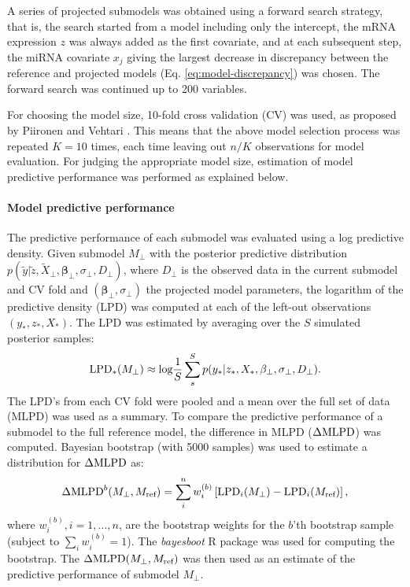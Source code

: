 A series of projected submodels was obtained using a
forward search strategy, that is, the search started from a model including
only the intercept, the mRNA expression $z$ was always added as the first
covariate, and at each subsequent step, the miRNA covariate $x_j$ giving the
largest decrease in discrepancy between the reference and projected models 
(Eq. \eqref{eq:model-discrepancy}) was
chosen. The forward search was continued up to 200 variables.

For choosing the model size, 10-fold cross validation (CV) was used, as proposed by
Piironen and Vehtari \citep{Piironen2016}. This means that the above model selection
process was repeated $K=10$ times, each time leaving out $n/K$ observations for
model evaluation. For judging the appropriate model size, estimation of model
predictive performance was performed as explained below.

\paragraph{Model predictive performance}
The predictive performance of each submodel was evaluated using 
a log predictive density.
Given submodel $M_\perp$ with the posterior predictive distribution
$p(\tilde{y}| \tilde{z}, \tilde{X}_\perp, \mathbf{\beta}_\perp, \sigma_\perp, D_\perp)$,
where $D_\perp$ is the observed data in the current submodel and CV fold and
$(\mathbf{\beta}_\perp, \sigma_\perp)$ the projected model parameters, the logarithm of the predictive density
(LPD) was computed at each of the left-out observations $(y_*, z_*, X_*)$.
The LPD was estimated by averaging over the $S$ simulated posterior samples:
\[
	\textup{LPD}_*(M_\perp) \approx \textup{log}\frac{1}{S} \sum_s^S p(y_*| z_*, X_*, \mathbf{\beta}_\perp, \sigma_\perp, D_\perp).
\]
The LPD's from each CV fold were pooled and a mean over the full set of data
(MLPD) was used as a summary. To compare the predictive performance of a
submodel to the full reference model, the difference in MLPD ($\Delta \textup{MLPD}$) was
computed. Bayesian bootstrap \citep{Rubin1981} (with 5000 samples) was used to estimate a
distribution for $\Delta \textup{MLPD}$ as:
\[
	\Delta \textup{MLPD}^{b}(M_\perp,M_{\textup{ref}}) = \sum_i^n w_i^{(b)} \left [ \textup{LPD}_i(M_\perp) - \textup{LPD}_i(M_{\textup{ref}}) \right ],
\]
where $w_i^{(b)}, i = 1, \dotsc,n$, are the bootstrap weights
for the $b$'th bootstrap sample (subject to $\sum_i w_i^{(b)} = 1$).
The \emph{bayesboot} R package was used for computing the bootstrap.
The $\Delta \textup{MLPD}(M_\perp,M_{\textup{ref}})$ was then used
as an estimate of the predictive performance of submodel $M_\perp$.


